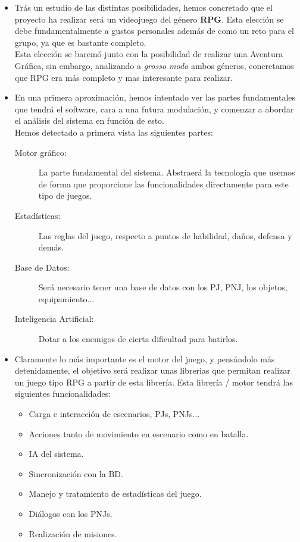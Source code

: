 \documentclass[a4paper,10pt]{article}
\begin{document}
\begin{itemize}
\item Trás un estudio de las distintas posibilidades, hemos concretado
  que el proyecto ha realizar será un videojuego del género
  \textbf{RPG}. Esta elección se debe fundamentalmente a gustos
  personales además de como un reto para el grupo, ya que es bastante
  completo.\\

  \noindent Esta elección se baremó junto con la posibilidad de
  realizar una Aventura Gráfica, sin embargo, analizando a
  \textit{grosso modo}  ambos géneros, concretamos que RPG era más
  completo y mas interesante para realizar.
\item En una primera aproximación, hemos intentado ver las partes
  fundamentales que tendrá el software, cara a una futura modulación,
  y comenzar a abordar el análisis del sistema en función de
  esto. \\

  \noindent Hemos detectado a primera vista las siguientes partes:
  
  \begin{description}
  \item[Motor gráfico: ] La parte fundamental del sistema. Abstraerá
    la tecnología que usemos de forma que proporcione las
    funcionalidades directamente para este tipo de juegos.
  \item[Estadísticas: ] Las reglas del juego, respecto a puntos de
    habilidad, daños, defensa y demás.
  \item[Base de Datos: ] Será necesario tener una base de datos con
    los PJ, PNJ, los objetos, equipamiento...
  \item[Inteligencia Artificial: ] Dotar a los enemigos de cierta
    dificultad para batirlos.
  \end{description}


\item Claramente lo más importante es el motor del juego, y
  pensándolo más detenidamente, el objetivo será realizar unas
  librerias que permitan realizar un juego tipo RPG a partir de esta
  librería. Esta librería / motor tendrá las siguientes
  funcionalidades:

  \begin{itemize}
  \item Carga e interacción de escenarios, PJs, PNJs...
  \item Acciones tanto de movimiento en escenario como en batalla.
  \item IA del sistema.
  \item Sincronización con la BD.
  \item Manejo y tratamiento de estadísticas del juego.
  \item Diálogos con los PNJs.
  \item Realización de misiones.
  \end{itemize}
  

\end{itemize}
\end{document}
